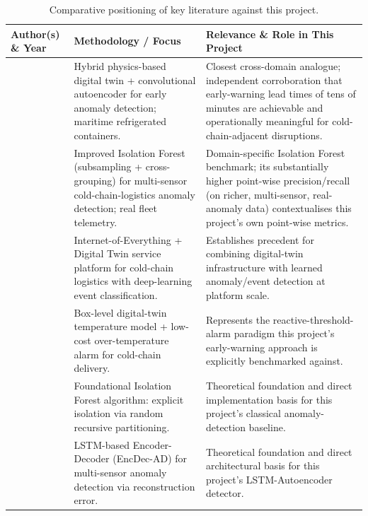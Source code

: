 \documentclass[11pt,a4paper,oneside]{report}
\begin{document}
\begin{table}[H]
\centering
\caption{Comparative positioning of key literature against this project.}
\label{tab:lit_matrix}
\small
\begin{tabularx}{\textwidth}{L{3.1cm} L{4.6cm} Y}
\toprule
\textbf{Author(s) \& Year} & \textbf{Methodology / Focus} & \textbf{Relevance \& Role in This Project} \\
\midrule
\textcite{vuksic2026early} & Hybrid physics-based digital twin + convolutional autoencoder for early anomaly detection; maritime refrigerated containers. & Closest cross-domain analogue; independent corroboration that early-warning lead times of tens of minutes are achievable and operationally meaningful for cold-chain-adjacent disruptions. \\
\addlinespace
\textcite{xie2025anomaly} & Improved Isolation Forest (subsampling + cross-grouping) for multi-sensor cold-chain-logistics anomaly detection; real fleet telemetry. & Domain-specific Isolation Forest benchmark; its substantially higher point-wise precision/recall (on richer, multi-sensor, real-anomaly data) contextualises this project's own point-wise metrics. \\
\addlinespace
\textcite{wu2023internet} & Internet-of-Everything + Digital Twin service platform for cold-chain logistics with deep-learning event classification. & Establishes precedent for combining digital-twin infrastructure with learned anomaly/event detection at platform scale. \\
\addlinespace
\textcite{meng2024costeffective} & Box-level digital-twin temperature model + low-cost over-temperature alarm for cold-chain delivery. & Represents the reactive-threshold-alarm paradigm this project's early-warning approach is explicitly benchmarked against. \\
\addlinespace
\textcite{liu2008isolation} & Foundational Isolation Forest algorithm: explicit isolation via random recursive partitioning. & Theoretical foundation and direct implementation basis for this project's classical anomaly-detection baseline. \\
\addlinespace
\textcite{malhotra2016lstm} & LSTM-based Encoder-Decoder (EncDec-AD) for multi-sensor anomaly detection via reconstruction error. & Theoretical foundation and direct architectural basis for this project's LSTM-Autoencoder detector. \\
\bottomrule
\end{tabularx}
\end{table}
\end{document}
